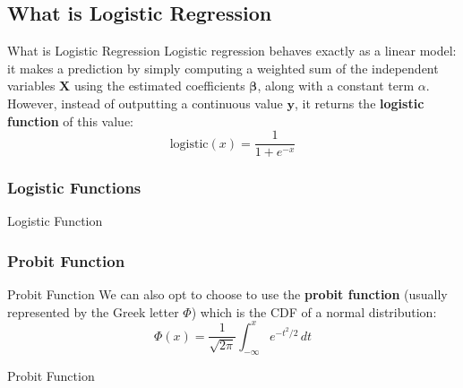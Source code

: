 \subsection{What is Logistic Regression}
\begin{frame}{What is Logistic Regression}
	Logistic regression behaves exactly as a linear model:
	it makes a prediction by simply computing a weighted sum of the
	independent variables $\mathbf{X}$ using the estimated coefficients $\boldsymbol{\beta}$,
	along with a constant term $\alpha$.
	However, instead of outputting a continuous value $\boldsymbol{y}$,
	it returns the \textbf{logistic function} of this value:
	$$
		\text{logistic}(x) = \frac{1}{1 + e^{-x}}
	$$
\end{frame}


\subsubsection{Logistic Functions}

\begin{frame}{Logistic Function}
\end{frame}

\subsubsection{Probit Function}
\begin{frame}{Probit Function}
	We can also opt to choose to use the \textbf{probit function}
	(usually represented by the Greek letter $\Phi$)
	which is the CDF of a normal distribution:
	$$
		\Phi (x)= \frac {1}{\sqrt {2 \pi}}\int _{-\infty }^{x}e^{-t^{2}/2}\,dt
	$$
\end{frame}

\begin{frame}{Probit Function}
\end{frame}

